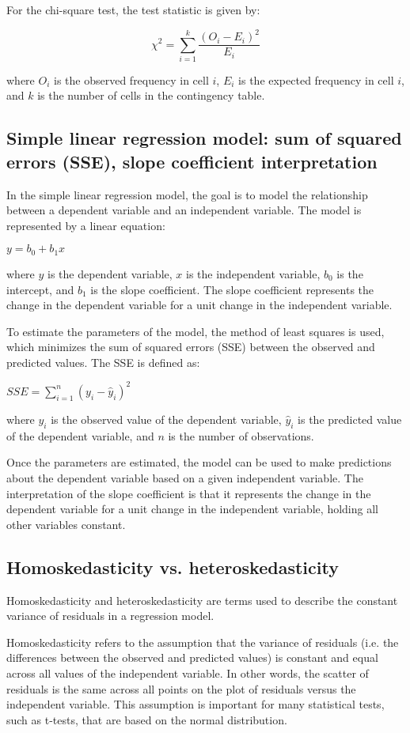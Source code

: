 \documentclass[12pt, a4paper, oneside]{article}
\begin{document}
For the chi-square test, the test statistic is given by:

$$\chi^2 = \sum_{i=1}^{k} \frac{(O_i - E_i)^2}{E_i}$$

where $O_i$ is the observed frequency in cell $i$, $E_i$ is the expected frequency in cell $i$, and $k$ is the number of cells in the contingency table.

\subsection{ Simple linear regression model: sum of squared errors (SSE), slope coefficient interpretation }
In the simple linear regression model, the goal is to model the relationship between a dependent variable and an independent variable. The model is represented by a linear equation:

$y = b_0 + b_1x$

where $y$ is the dependent variable, $x$ is the independent variable, $b_0$ is the intercept, and $b_1$ is the slope coefficient. The slope coefficient represents the change in the dependent variable for a unit change in the independent variable.

To estimate the parameters of the model, the method of least squares is used, which minimizes the sum of squared errors (SSE) between the observed and predicted values. The SSE is defined as:

$SSE = \sum_{i=1}^n (y_i - \hat{y}_i)^2$

where $y_i$ is the observed value of the dependent variable, $\hat{y}_i$ is the predicted value of the dependent variable, and $n$ is the number of observations.

Once the parameters are estimated, the model can be used to make predictions about the dependent variable based on a given independent variable. The interpretation of the slope coefficient is that it represents the change in the dependent variable for a unit change in the independent variable, holding all other variables constant.
\subsection{ Homoskedasticity vs. heteroskedasticity  }
Homoskedasticity and heteroskedasticity are terms used to describe the constant variance of residuals in a regression model.

Homoskedasticity refers to the assumption that the variance of residuals (i.e. the differences between the observed and predicted values) is constant and equal across all values of the independent variable. In other words, the scatter of residuals is the same across all points on the plot of residuals versus the independent variable. This assumption is important for many statistical tests, such as t-tests, that are based on the normal distribution.
\end{document}
